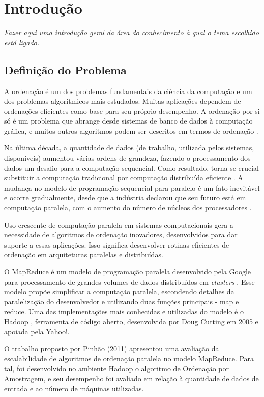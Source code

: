 \chapter{Introdução}
\label{cap:introducao}

\textit{Fazer aqui uma introdução geral da área do conhecimento à qual o tema escolhido está ligado.}

\section{Definição do Problema}

A ordenação é um dos problemas fundamentais da ciência da computação e um dos problemas algorítmicos mais estudados. Muitas aplicações dependem de ordenações eficientes como base para seu próprio desempenho. A ordenação por si só é um problema que abrange desde sistemas de banco de dados à computação gráfica, e muitos outros algoritmos podem ser descritos em termos de ordenação  \cite{Satish:2009,Amato:1996}.  

Na última década, a quantidade de dados (de trabalho, utilizada pelos sistemas, disponíveis) aumentou várias ordens de grandeza, fazendo o processamento dos dados um desafio para a computação sequencial. Como resultado, torna-se crucial substituir a computação tradicional por computação distribuída eficiente \cite{lin:2010}. A mudança no modelo de programação sequencial para paralelo é um fato inevitável e ocorre gradualmente, desde que a indústria declarou que seu futuro está em computação paralela, com o aumento do número de núcleos dos processadores \cite{Asanovic:2009}. 

Uso crescente de computação paralela em sistemas computacionais gera a necessidade de algoritmos de ordenação inovadores, desenvolvidos para dar suporte a essas aplicações. Isso significa desenvolver rotinas eficientes de ordenação em arquiteturas paralelas e distribuídas. 

O MapReduce é um modelo de programação paralela desenvolvido pela Google para processamento de grandes volumes de dados distribuídos em \textit{clusters} \cite{Dean:2008}. Esse modelo propõe simplificar a computação paralela, escondendo detalhes da paralelização do desenvolvedor e utilizando duas funções principais - map e reduce.
Uma das implementações mais conhecidas e utilizadas do modelo é o Hadoop \cite{Hadoop:2010}, ferramenta de código aberto, desenvolvida por Doug Cutting em 2005 e apoiada pela Yahoo!. 

O trabalho proposto por Pinhão (2011) %
apresentou uma avaliação da escalabilidade de algoritmos de ordenação paralela no modelo MapReduce. Para tal, foi desenvolvido no ambiente Hadoop o algoritmo de Ordenação por Amostragem, e seu desempenho foi avaliado em relação à quantidade de dados de entrada e ao número de máquinas utilizadas. 


